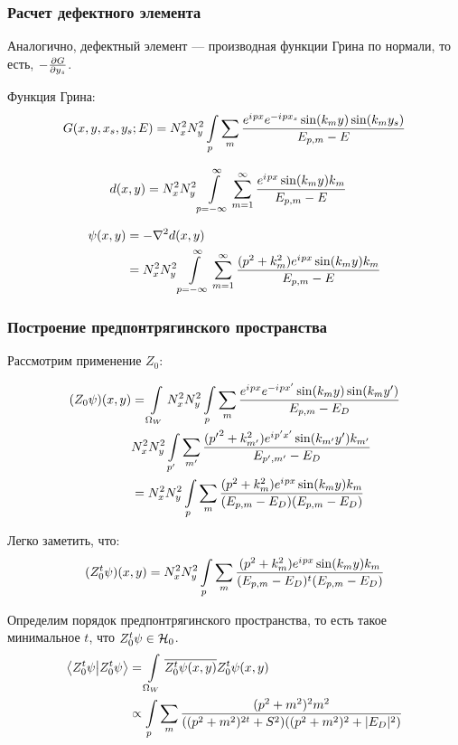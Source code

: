 \subsubsection{Расчет дефектного элемента}
Аналогично, дефектный элемент — производная функции Грина по нормали, то есть, $-\pdv{G}{y_s}$.

Функция Грина:
\[
G(x, y, x_s, y_s; E) = N_x^2 N_y^2 \int\limits_p \sum\limits_m \frac{e^{{i\mkern1mu} p x} e^{-{i\mkern1mu} p x_s} \sin(k_m y) \sin(k_m y_s)}{E_{p, m} - E}
\]

\begin{align*}
d(x, y) 
&= N_x^2 N_y^2 \int\limits_{p = -\infty}^\infty \sum\limits_{m = 1}^\infty \frac{e^{{i\mkern1mu} p x} \sin(k_m y) k_m }{E_{p, m} - E}
\end{align*}

\begin{align*}
\psi(x, y) 
&= -\laplacian d(x, y) \\
&= N_x^2 N_y^2 \int\limits_{p = -\infty}^\infty \sum\limits_{m = 1}^\infty \frac{(p^2 + k_m^2) e^{\iu p x} \sin(k_m y) k_m }{E_{p, m} - E}
\end{align*}

\subsubsection{Построение предпонтрягинского пространства}
Рассмотрим применение $Z_0$:

\begin{align*}
(Z_0 \psi)(x, y)
&= \int\limits_{\Omega_W} N_x^2 N_y^2 \int\limits_p \sum\limits_m \frac{e^{{i\mkern1mu} p x} e^{-{i\mkern1mu} p x'} \sin(k_m y) \sin(k_m y')}{E_{p, m} - E_D} \\
&  N_x^2 N_y^2 \int\limits_{p'} \sum\limits_{m'} \frac{({p'}^2 + k_{m'}^2) e^{{i\mkern1mu} p' x'} \sin(k_{m'} y') k_{m'} }{E_{p', m'} - E_D} \\
&= N_x^2 N_y^2 \int\limits_p \sum\limits_m \frac{(p^2 + k_m^2) e^{{i\mkern1mu} p x} \sin(k_m y) k_m}{(E_{p, m} - E_D) (E_{p, m} - E_D)}
\end{align*}

Легко заметить, что:
\begin{align*}
(Z_0^t \psi)(x, y) =
N_x^2 N_y^2 \int\limits_p \sum\limits_m \frac{(p^2 + k_m^2) e^{{i\mkern1mu} p x} \sin(k_m y) k_m}{(E_{p, m} - E_D)^t (E_{p, m} - E_D)}
\end{align*}

Определим порядок предпонтрягинского пространства, то есть такое минимальное $t$, что $Z_0^t \psi \in \mathcal{H}_{0}$.
\begin{align*}
\ip{Z_0^t \psi}{Z_0^t \psi}
&= \int\limits_{\Omega_W} \cconj{Z_0^t \psi(x, y)} Z_0^t \psi(x, y) \\
&\propto \int\limits_p \sum\limits_m \frac{(p^2 + m^2)^2 m^2}{((p^2 + m^2)^{2t} + S^2 ) ((p^2 + m^2)^2 + |E_D|^2)}
\end{align*}

